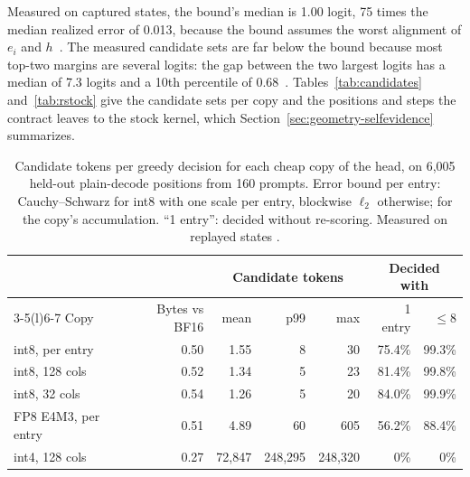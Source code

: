 Measured on captured states, the bound's median is 1.00 logit, 75 times the median realized error of 0.013, because the bound assumes the worst alignment of $e_i$ and $h$~. The measured candidate sets are far below the bound because most top-two margins are several logits: the gap between the two largest logits has a median of 7.3 logits and a 10th percentile of 0.68~. Tables~\ref{tab:candidates} and~\ref{tab:rstock} give the candidate sets per copy and the positions and steps the contract leaves to the stock kernel, which Section~\ref{sec:geometry-selfevidence} summarizes.

\begin{table}[htbp]
\caption{Candidate tokens per greedy decision for each cheap copy of the head, on 6,005 held-out plain-decode positions from 160 prompts. Error bound per entry: Cauchy--Schwarz for int8 with one scale per entry, blockwise $\ell_2$ otherwise; \modelcons{} for the copy's accumulation. ``1 entry'': decided without re-scoring. Measured on replayed states .}\label{tab:candidates}\label{tab:geometry-candidates}
\vskip 0.05in
\centering\tablefont\setlength{\tabcolsep}{4pt}
\begin{tabular}{@{}lrrrrrr@{}}
\toprule
& & \multicolumn{3}{c}{Candidate tokens} & \multicolumn{2}{c}{Decided with}\\\cmidrule(lr){3-5}\cmidrule(l){6-7}
Copy & Bytes vs BF16 & mean & p99 & max & 1 entry & $\le8$\\\midrule
int8, per entry & 0.50 & 1.55 & 8 & 30 & 75.4\% & 99.3\%\\
int8, 128 cols & 0.52 & 1.34 & 5 & 23 & 81.4\% & 99.8\%\\
int8, 32 cols & 0.54 & 1.26 & 5 & 20 & 84.0\% & 99.9\%\\
FP8 E4M3, per entry & 0.51 & 4.89 & 60 & 605 & 56.2\% & 88.4\%\\
int4, 128 cols & 0.27 & 72,847 & 248,295 & 248,320 & 0\% & 0\%\\
\bottomrule
\end{tabular}
\end{table}

